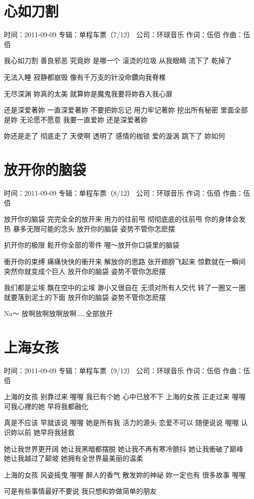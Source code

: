 \documentclass[UTF8,a4paper,oneside,twocolumn,12pt]{ctexbook}
\newcommand{\infopair}[2]{\textbullet #1：#2}
\newcommand{\zc}[1][伍佰]{\infopair{作词}{#1}}
\newcommand{\zq}[1][伍佰]{\infopair{作曲}{#1}}
\newcommand{\zj}[1]{\infopair{专辑}{#1}}
\newcommand{\sj}[1]{\infopair{时间}{#1}}
\newcommand{\gs}[1]{\infopair{公司}{#1}}
\newenvironment{info}{\begin{flushleft}\kaishu
	}
	{\end{flushleft}\normalsize\yahei\par}
\newenvironment{lyric}{
	}
{}
\begin{document}
\section{心如刀割}
\begin{info}
	\sj{2011-09-09}
	\zj{单程车票（7/12）}
	\gs{环球音乐}
	\zc
	\zq
\end{info}
\begin{lyric}
	我心如刀割 善良邪恶 究竟妳 是哪一个
	滚烫的垃圾 从我眼睛 流下了 乾掉了

	无法入睡 寂静都崩毁
	像有千万支的针没命鑽向我脊椎

	无尽深渊 妳真的太美
	就算妳是魔鬼我要将妳吞入我心扉

	还是深爱著妳 一直深爱著妳
	不要把妳忘记 用力牢记著妳
	挖出所有秘密 里面全部是妳
	无论愿不愿意 我要一直爱妳
	还是深爱著妳

	妳还是走了 彻底走了 天使啊 透明了
	感情的枷锁 爱的漩涡 跳下了 妳如何
\end{lyric}

\section{放开你的脑袋}
\begin{info}
	\sj{2011-09-09}
	\zj{单程车票（8/12）}
	\gs{环球音乐}
	\zc
	\zq
\end{info}
\begin{lyric}
	放开你的脑袋
	完完全全的放开来
	用力的往前甩
	彻彻底底的往前甩
	你的身体会发热
	暴多无限可能的念头
	放开你的脑袋
	姿势不管你怎麽摆

	扒开你的极限
	鬆开你全部的零件
	喔～放开你口袋里的脑袋

	衝开你的束缚
	痛痛快快的衝开来
	解放你的思路
	张开翅膀飞起来
	惊歎就在一瞬间
	突然你就变成个巨人
	放开你的脑袋
	姿势不管你怎麽摆

	我们都是尘埃
	飘在空中的尘埃
	渺小又很自在
	无须对所有人交代
	转了一圈又一圈
	就要落到泥土的下面
	放开你的脑袋
	姿势不管你怎麽摆

	Na～
	放啊放啊放啊放啊……全部放开
\end{lyric}

\section{上海女孩}
\begin{info}
	\sj{2011-09-09}
	\zj{单程车票（9/12）}
	\gs{环球音乐}
	\zc
	\zq
\end{info}
\begin{lyric}
	上海的女孩 别靠过来 喔喔
	我已有个她 心中已放不下
	上海的女孩 正走过来 喔喔
	可我心裡的她 早将我都融化

	真是不应该 早就该说 喔喔
	她是所有我 活力的源头
	恋爱不可以 随便说说 喔喔
	认识妳以前 她早将我拯救

	她让我世界更开阔
	她让我黑暗都摆脱
	她让我不再有寒冷颤抖
	她让我衝破了巅峰
	她让我越过了颠坡
	她拥有全世界最美丽的温柔

	上海的女孩 风姿摇曳 喔喔
	醉人的香气 散发妳的神祕
	妳一定也有 很多故事 喔喔

	可是有些事情最好不要说
	我只想和妳做简单的朋友
\end{lyric}
\end{document}
